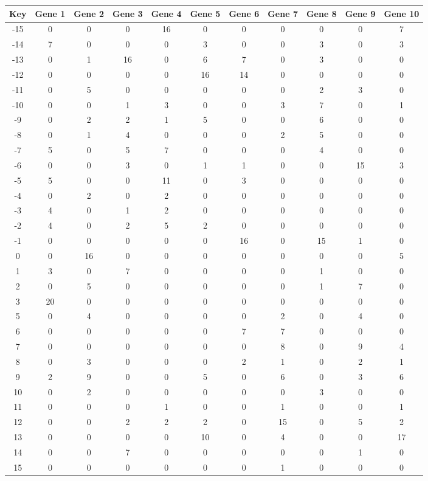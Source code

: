 \begin{tabular}{|c|c|c|c|c|c|c|c|c|c|c|}
\hline
Key & Gene 1 & Gene 2 & Gene 3 & Gene 4 & Gene 5 & Gene 6 & Gene 7 & Gene 8 & Gene 9 & Gene 10 \\
\hline
-15 & 0 & 0 & 0 & 16 & 0 & 0 & 0 & 0 & 0 & 7 \\
-14 & 7 & 0 & 0 & 0 & 3 & 0 & 0 & 3 & 0 & 3 \\
-13 & 0 & 1 & 16 & 0 & 6 & 7 & 0 & 3 & 0 & 0 \\
-12 & 0 & 0 & 0 & 0 & 16 & 14 & 0 & 0 & 0 & 0 \\
-11 & 0 & 5 & 0 & 0 & 0 & 0 & 0 & 2 & 3 & 0 \\
-10 & 0 & 0 & 1 & 3 & 0 & 0 & 3 & 7 & 0 & 1 \\
-9 & 0 & 2 & 2 & 1 & 5 & 0 & 0 & 6 & 0 & 0 \\
-8 & 0 & 1 & 4 & 0 & 0 & 0 & 2 & 5 & 0 & 0 \\
-7 & 5 & 0 & 5 & 7 & 0 & 0 & 0 & 4 & 0 & 0 \\
-6 & 0 & 0 & 3 & 0 & 1 & 1 & 0 & 0 & 15 & 3 \\
-5 & 5 & 0 & 0 & 11 & 0 & 3 & 0 & 0 & 0 & 0 \\
-4 & 0 & 2 & 0 & 2 & 0 & 0 & 0 & 0 & 0 & 0 \\
-3 & 4 & 0 & 1 & 2 & 0 & 0 & 0 & 0 & 0 & 0 \\
-2 & 4 & 0 & 2 & 5 & 2 & 0 & 0 & 0 & 0 & 0 \\
-1 & 0 & 0 & 0 & 0 & 0 & 16 & 0 & 15 & 1 & 0 \\
0 & 0 & 16 & 0 & 0 & 0 & 0 & 0 & 0 & 0 & 5 \\
1 & 3 & 0 & 7 & 0 & 0 & 0 & 0 & 1 & 0 & 0 \\
2 & 0 & 5 & 0 & 0 & 0 & 0 & 0 & 1 & 7 & 0 \\
3 & 20 & 0 & 0 & 0 & 0 & 0 & 0 & 0 & 0 & 0 \\
5 & 0 & 4 & 0 & 0 & 0 & 0 & 2 & 0 & 4 & 0 \\
6 & 0 & 0 & 0 & 0 & 0 & 7 & 7 & 0 & 0 & 0 \\
7 & 0 & 0 & 0 & 0 & 0 & 0 & 8 & 0 & 9 & 4 \\
8 & 0 & 3 & 0 & 0 & 0 & 2 & 1 & 0 & 2 & 1 \\
9 & 2 & 9 & 0 & 0 & 5 & 0 & 6 & 0 & 3 & 6 \\
10 & 0 & 2 & 0 & 0 & 0 & 0 & 0 & 3 & 0 & 0 \\
11 & 0 & 0 & 0 & 1 & 0 & 0 & 1 & 0 & 0 & 1 \\
12 & 0 & 0 & 2 & 2 & 2 & 0 & 15 & 0 & 5 & 2 \\
13 & 0 & 0 & 0 & 0 & 10 & 0 & 4 & 0 & 0 & 17 \\
14 & 0 & 0 & 7 & 0 & 0 & 0 & 0 & 0 & 1 & 0 \\
15 & 0 & 0 & 0 & 0 & 0 & 0 & 1 & 0 & 0 & 0 \\
\hline
\end{tabular}